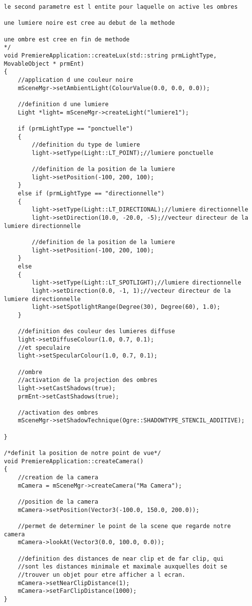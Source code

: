 \begin{lstlisting}[caption={PremiereApplication.cpp: ajout d'une méthode pour la gestion de lumière et des ombres}]
    le second parametre est l entite pour laquelle on active les ombres

une lumiere noire est cree au debut de la methode

une ombre est cree en fin de methode
*/
void PremiereApplication::createLux(std::string prmLightType, MovableObject * prmEnt)
{
    //application d une couleur noire
    mSceneMgr->setAmbientLight(ColourValue(0.0, 0.0, 0.0)); 

    //definition d une lumiere 
    Light *light= mSceneMgr->createLight("lumiere1");

    if (prmLightType == "ponctuelle")
    {
        //definition du type de lumiere
        light->setType(Light::LT_POINT);//lumiere ponctuelle

        //definition de la position de la lumiere
        light->setPosition(-100, 200, 100);
    }
    else if (prmLightType == "directionnelle")
    {
        light->setType(Light::LT_DIRECTIONAL);//lumiere directionnelle
        light->setDirection(10.0, -20.0, -5);//vecteur directeur de la lumiere directionnelle

        //definition de la position de la lumiere
        light->setPosition(-100, 200, 100);
    }
    else
    {
        light->setType(Light::LT_SPOTLIGHT);//lumiere directionnelle
        light->setDirection(0.0, -1, 1);//vecteur directeur de la lumiere directionnelle
        light->setSpotlightRange(Degree(30), Degree(60), 1.0);
    }

    //definition des couleur des lumieres diffuse
    light->setDiffuseColour(1.0, 0.7, 0.1);
    //et speculaire
    light->setSpecularColour(1.0, 0.7, 0.1);

    //ombre
    //activation de la projection des ombres
    light->setCastShadows(true);
    prmEnt->setCastShadows(true);

    //activation des ombres
    mSceneMgr->setShadowTechnique(Ogre::SHADOWTYPE_STENCIL_ADDITIVE);

}

/*definit la position de notre point de vue*/
void PremiereApplication::createCamera()
{
    //creation de la camera
    mCamera = mSceneMgr->createCamera("Ma Camera");

    //position de la camera
    mCamera->setPosition(Vector3(-100.0, 150.0, 200.0));

    //permet de determiner le point de la scene que regarde notre camera
    mCamera->lookAt(Vector3(0.0, 100.0, 0.0));

    //definition des distances de near clip et de far clip, qui
    //sont les distances minimale et maximale auxquelles doit se
    //trouver un objet pour etre afficher a l ecran.
    mCamera->setNearClipDistance(1);
    mCamera->setFarClipDistance(1000);
}


\end{lstlisting}
